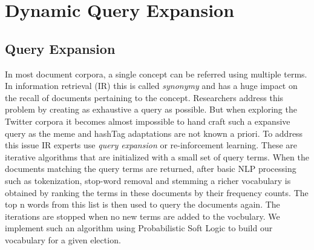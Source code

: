 \chapter{Dynamic Query Expansion}
\section{Query Expansion}
In most document corpora, a single concept can be referred using multiple terms.
In information retrieval (IR) this is called \emph{synonymy} and has a huge impact on the recall of documents pertaining to the concept.
Researchers address this problem by creating as exhaustive a query as possible. 
But when exploring the Twitter corpora it becomes almost impossible to hand craft such a expansive query as the meme and hashTag adaptations are not known a priori. 
\newline
To address this issue IR experts use \emph{query expansion} or re-inforcement learning.
These are iterative algorithms that are initialized with a small set of query terms. 
When the documents matching the query terms are returned, after basic NLP processing such as tokenization, stop-word removal and stemming a richer vocabulary is obtained by ranking the terms in these documents by their frequency counts.
The top n words from this list is then used to query the documents again. 
The iterations are stopped when no new terms are added to the vocbulary. 
We implement such an algorithm using Probabilistic Soft Logic to build our vocabulary for a given election.
